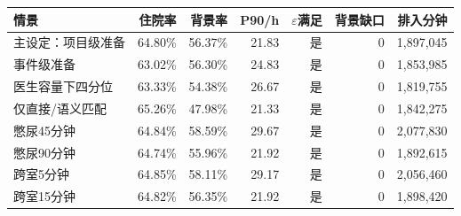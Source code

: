 \begin{tabularx}{\textwidth}{Xrrrrrr}
\toprule
情景 & 住院率 & 背景率 & P90/h & $\varepsilon$满足 & 背景缺口 & 排入分钟 \\
\midrule
主设定：项目级准备 & 64.80\% & 56.37\% & 21.83 & 是 & 0 & 1,897,045 \\
事件级准备 & 63.02\% & 56.30\% & 24.83 & 是 & 0 & 1,853,985 \\
医生容量下四分位 & 63.33\% & 54.38\% & 26.67 & 是 & 0 & 1,819,755 \\
仅直接/语义匹配 & 65.26\% & 47.98\% & 21.33 & 是 & 0 & 1,842,275 \\
憋尿45分钟 & 64.84\% & 58.59\% & 29.67 & 是 & 0 & 2,077,830 \\
憋尿90分钟 & 64.74\% & 55.96\% & 21.92 & 是 & 0 & 1,892,615 \\
跨室5分钟 & 64.85\% & 58.11\% & 29.17 & 是 & 0 & 2,056,460 \\
跨室15分钟 & 64.82\% & 56.35\% & 21.92 & 是 & 0 & 1,898,420 \\
\bottomrule
\end{tabularx}
